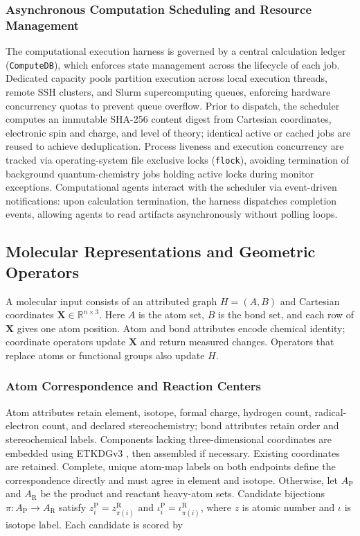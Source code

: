 \subsubsection{Asynchronous Computation Scheduling and Resource Management}
The computational execution harness is governed by a central calculation ledger (\texttt{ComputeDB}), which enforces state management across the lifecycle of each job. Dedicated capacity pools partition execution across local execution threads, remote SSH clusters, and Slurm supercomputing queues, enforcing hardware concurrency quotas to prevent queue overflow. Prior to dispatch, the scheduler computes an immutable SHA-256 content digest from Cartesian coordinates, electronic spin and charge, and level of theory; identical active or cached jobs are reused to achieve deduplication. Process liveness and execution concurrency are tracked via operating-system file exclusive locks (\texttt{flock}), avoiding termination of background quantum-chemistry jobs holding active locks during monitor exceptions. Computational agents interact with the scheduler via event-driven notifications: upon calculation termination, the harness dispatches completion events, allowing agents to read artifacts asynchronously without polling loops.

\subsection{Molecular Representations and Geometric Operators}
A molecular input consists of an attributed graph $H=(A,B)$ and Cartesian coordinates $\mathbf{X}\in\mathbb{R}^{n\times 3}$. Here $A$ is the atom set, $B$ is the bond set, and each row of $\mathbf{X}$ gives one atom position. Atom and bond attributes encode chemical identity; coordinate operators update $\mathbf{X}$ and return measured changes. Operators that replace atoms or functional groups also update $H$.

\subsubsection{Atom Correspondence and Reaction Centers}
Atom attributes retain element, isotope, formal charge, hydrogen count, radical-electron count, and declared stereochemistry; bond attributes retain order and stereochemical labels. Components lacking three-dimensional coordinates are embedded using ETKDGv3 \citep{ref12,ref13}, then assembled if necessary. Existing coordinates are retained. Complete, unique atom-map labels on both endpoints define the correspondence directly and must agree in element and isotope. Otherwise, let $A_{\mathrm{P}}$ and $A_{\mathrm{R}}$ be the product and reactant heavy-atom sets. Candidate bijections $\pi:A_{\mathrm{P}}\to A_{\mathrm{R}}$ satisfy $z_i^{\mathrm{P}}=z_{\pi(i)}^{\mathrm{R}}$ and $\iota_i^{\mathrm{P}}=\iota_{\pi(i)}^{\mathrm{R}}$, where $z$ is atomic number and $\iota$ is isotope label. Each candidate is scored by

